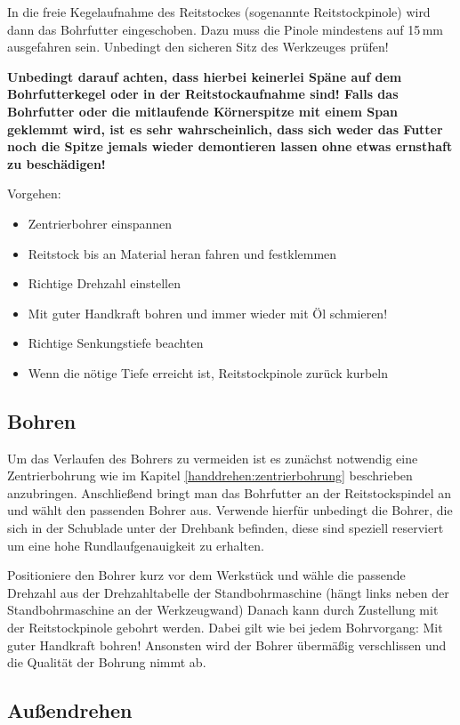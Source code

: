 \documentclass{\basedir/fablab-document}
\begin{document}
In die freie Kegelaufnahme des Reitstockes (sogenannte Reitstockpinole) wird dann das Bohrfutter eingeschoben.
Dazu muss die Pinole mindestens auf 15\,mm ausgefahren sein.
Unbedingt den sicheren Sitz des Werkzeuges prüfen!

\textbf{Unbedingt darauf achten, dass hierbei keinerlei Späne auf dem Bohrfutterkegel oder in der Reitstockaufnahme sind! Falls das Bohrfutter oder die mitlaufende Körnerspitze mit einem Span geklemmt wird, ist es sehr wahrscheinlich, dass sich weder das Futter noch die Spitze jemals wieder demontieren lassen ohne etwas ernsthaft zu beschädigen!}

Vorgehen:
\begin{itemize}
\item Zentrierbohrer einspannen
\item Reitstock bis an Material heran fahren und festklemmen
\item Richtige Drehzahl einstellen
\item Mit guter Handkraft bohren und immer wieder mit Öl schmieren!
\item Richtige Senkungstiefe beachten
\item Wenn die nötige Tiefe erreicht ist, Reitstockpinole zurück kurbeln

\end{itemize}

\subsection{Bohren}

Um das Verlaufen des Bohrers zu vermeiden ist es zunächst notwendig eine Zentrierbohrung wie im Kapitel \ref{handdrehen:zentrierbohrung} beschrieben anzubringen.
Anschließend bringt man das Bohrfutter an der Reitstockspindel an und wählt den passenden Bohrer aus.
Verwende hierfür unbedingt die Bohrer, die sich in der Schublade unter der Drehbank befinden, diese sind speziell reserviert um eine hohe Rundlaufgenauigkeit zu erhalten.

Positioniere den Bohrer kurz vor dem Werkstück und wähle die passende Drehzahl aus der Drehzahltabelle der Standbohrmaschine (hängt links neben der Standbohrmaschine an der Werkzeugwand)
Danach kann durch Zustellung mit der Reitstockpinole gebohrt werden.
Dabei gilt wie bei jedem Bohrvorgang: Mit guter Handkraft bohren!
Ansonsten wird der Bohrer übermäßig verschlissen und die Qualität der Bohrung nimmt ab.

\subsection{Außendrehen} 
\end{document}
